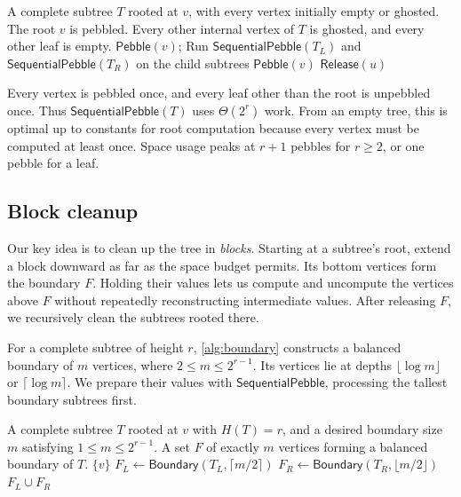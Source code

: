 \documentclass[11pt]{article}
\theoremstyle{definition}
\theoremstyle{remark}
\newcommand{\Peb}{\mathsf{Pebble}}
\newcommand{\Fast}{\mathsf{SequentialPebble}}
\newcommand{\Release}{\mathsf{Release}}
\begin{document}
\begin{algorithm}[H]
\caption{Bottom-up root computation $\Fast(T)$}
\label{alg:fast-root}
\begin{algorithmic}[1]
\Require A complete subtree $T$ rooted at $v$, with every vertex initially empty or ghosted.
\Ensure The root $v$ is pebbled. Every other internal vertex of $T$ is ghosted, and every other leaf is empty.
 \State $\Peb(v)$; \Return
\EndIf
\State Run $\Fast(T_L)$ and $\Fast(T_R)$ on the child subtrees
\State $\Peb(v)$
\State $\Release(u)$
\EndFor
\end{algorithmic}
\end{algorithm}

Every vertex is pebbled once, and every leaf other than the root is unpebbled once. Thus $\Fast(T)$ uses $\Theta(2^r)$ work. From an empty tree, this is optimal up to constants for root computation because every vertex must be computed at least once. Space usage peaks at $r+1$ pebbles for $r\ge2$, or one pebble for a leaf.

\subsection{Block cleanup}
\label{sec:block-cleanup}

Our key idea is to clean up the tree in \emph{blocks}. Starting at a subtree's root, extend a block downward as far as the space budget permits. Its bottom vertices form the boundary $F$. Holding their values lets us compute and uncompute the vertices above $F$ without repeatedly reconstructing intermediate values. After releasing $F$, we recursively clean the subtrees rooted there.

For a complete subtree of height $r$, \cref{alg:boundary} constructs a balanced boundary of $m$ vertices, where $2\le m\le2^{r-1}$. Its vertices lie at depths $\lfloor\log m\rfloor$ or $\lceil\log m\rceil$. We prepare their values with $\Fast$, processing the tallest boundary subtrees first.

\begin{algorithm}[H]
\caption{Constructing a balanced boundary $\mathsf{Boundary}(T,m)$}
\label{alg:boundary}
\begin{algorithmic}[1]
\Require A complete subtree $T$ rooted at $v$ with $H(T)=r$, and a desired boundary size $m$ satisfying $1\le m\le2^{r-1}$.
\Ensure A set $F$ of exactly $m$ vertices forming a balanced boundary of $T$.
 \State \Return $\{v\}$
\EndIf
\State $F_L\gets\mathsf{Boundary}(T_L,\lceil m/2\rceil)$
\State $F_R\gets\mathsf{Boundary}(T_R,\lfloor m/2\rfloor)$
\State \Return $F_L\cup F_R$
\end{algorithmic}
\end{algorithm}
\end{document}
